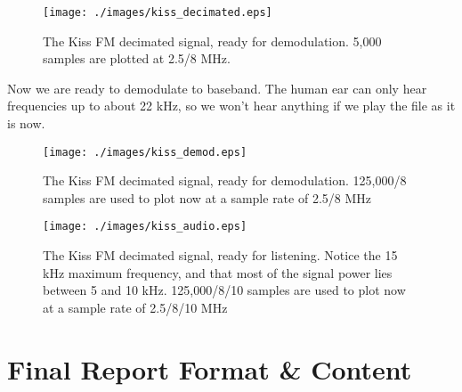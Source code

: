 \documentclass[letterpaper,12pt]{article}
\begin{document}
\begin{figure}[h]
 \centering
 \texttt{[image: ./images/kiss\_decimated.eps]}
 \caption{The Kiss FM decimated signal, ready for demodulation. 5,000 samples are plotted at 2.5/8 MHz.}\label{f:kiss_decimated}
\end{figure}

Now we are ready to demodulate to baseband. The human ear can only hear frequencies up to about 22 kHz, so we won't hear anything if we play the file as it is now.



\begin{figure}[h]
 \centering
 \texttt{[image: ./images/kiss\_demod.eps]}
 \caption{The Kiss FM decimated signal, ready for demodulation. 125,000/8 samples are used to plot now at a sample rate of 2.5/8 MHz}\label{f:kiss_demod}
\end{figure}



\begin{figure}[h]
 \centering
 \texttt{[image: ./images/kiss\_audio.eps]}
 \caption{The Kiss FM decimated signal, ready for listening. Notice the 15 kHz maximum frequency, and that most of the signal power lies between 5 and 10 kHz. 125,000/8/10 samples are used to plot now at a sample rate of 2.5/8/10 MHz}\label{f:kiss_audio}
\end{figure}



\pagebreak
\section{Final Report Format \& Content}
\end{document}
